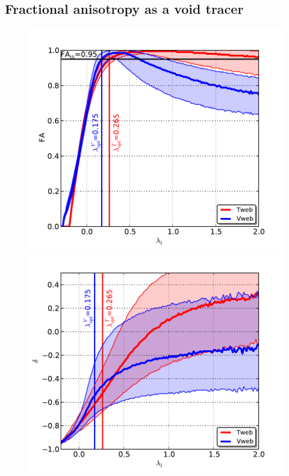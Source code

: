 \documentclass[a4,useAMS,usenatbib,usegraphicx]{mn2e}
\begin{document}
\subsection{Fractional anisotropy as a void tracer}
\label{subsec:web_voids}


\begin{figure}
\centering

  \includegraphics[trim = 2mm 2mm 5mm 10mm, clip, keepaspectratio=true,
  width=0.3\textheight]{FA_L1.pdf}
  \includegraphics[trim = 2mm 2mm 5mm 10mm, clip, keepaspectratio=true,
  width=0.3\textheight]{delta_L1.pdf}  
  

\end{figure}
\end{document}
